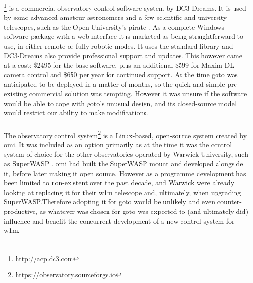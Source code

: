 \begin{colsection}
\begin{colsection}
\subsubsection{}
\footnote{\url{http://acp.dc3.com}} is a commercial observatory control software system by DC3-Dreams. It is used by some advanced amateur astronomers and a few scientific and university telescopes, such as the Open University's \gls{pirate} \citep{PIRATE}. As a complete Windows software package with a web interface it is marketed as being straightforward to use, in either remote or fully robotic modes. It uses the  standard library and DC3-Dreams also provide professional support and updates. This however came at a cost: \$2495 for the base software, plus an additional \$599 for Maxim DL camera control and \$650 per year for continued support. At the time \gls{goto} was anticipated to be deployed in a matter of months, so the quick and simple pre-existing commercial solution was tempting. However it was unsure if the  software would be able to cope with \gls{goto}'s unusual design, and its closed-source model would restrict our ability to make modifications.

\subsubsection{}

The  observatory control system\footnote{\url{https://observatory.sourceforge.io}} is a Linux-based, open-source system created by \gls{omi}. It was included as an option primarily as at the time it was the control system of choice for the other observatories operated by Warwick University, such as SuperWASP \citep{SuperWASP}. \gls{omi} had built the SuperWASP mount and developed  alongside it, before later making it open source. However as a programme development has been limited to non-existent over the past decade, and Warwick were already looking at replacing it for their \gls{w1m} telescope and, ultimately, when upgrading SuperWASP.\@ Therefore adopting it for \gls{goto} would be unlikely and even counter-productive, as whatever was chosen for \gls{goto} was expected to (and ultimately did) influence and benefit the concurrent development of a new control system for \gls{w1m}.

\subsubsection{}


\end{colsection}
\end{colsection}
